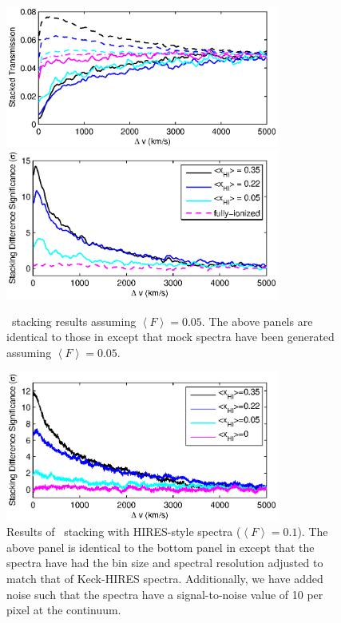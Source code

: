 \begin{figure}[h]
  \centering
  \includegraphics[width=9cm]{fig7a.eps}
  \includegraphics[width=9cm]{fig7b.eps}
  \caption{\lya\ stacking results assuming $\left\langle F \right\rangle = 0.05$. The above panels are identical to those in  except that mock spectra have been generated assuming $\left\langle F \right\rangle = 0.05$. }
  \label{fig:LyaResults_LowF}
\end{figure}


\begin{figure}[h]
  \centering
  \includegraphics[width=9cm]{fig8.eps}
  \caption{Results of \lya\ stacking with HIRES-style spectra ($\left\langle F \right\rangle = 0.1$). The above panel is identical to the bottom panel in  except that the spectra have had the bin size and spectral resolution adjusted to match that of Keck-HIRES spectra. Additionally, we have added noise such that the spectra have a signal-to-noise value of 10 per pixel at the continuum.}
  \label{fig:HIRES_LyaResults_Noisy}
\end{figure}


